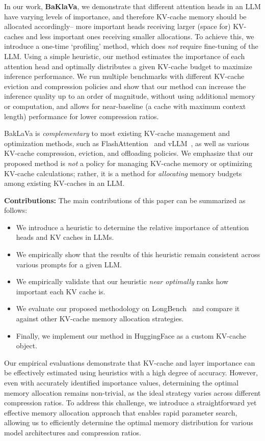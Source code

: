 In our work, {\bf BaKlaVa}, we demonstrate that different attention heads in an LLM have varying levels of importance, and therefore KV-cache memory should be allocated accordingly-- more important heads receiving larger (space for) KV-caches and less important ones receiving smaller allocations. To achieve this, we introduce a one-time `profiling' method, which does \textit{not} require fine-tuning of the LLM. Using a simple heuristic, our method estimates the importance of each attention head and optimally distributes a given KV-cache budget to maximize inference performance. We run multiple benchmarks with different KV-cache eviction and compression policies and show that our method can increase the inference quality up to an order of magnitude, without using additional memory or computation, and allows for near-baseline (a cache with maximum context length) performance for lower compression ratios.

BakLaVa is {\em complementary} to most existing KV-cache management and optimization methods, such as FlashAttention~\cite{flashattention2} and vLLM~\cite{pagedattention}, as well as various KV-cache compression, eviction, and offloading policies. We emphasize that our proposed method is {\em not} a policy for managing KV-cache memory or optimizing KV-cache calculations; rather, it is a method for \emph{allocating} memory budgets among existing KV-caches in an LLM.

\textbf{Contributions:} The main contributions of this paper can be summarized as follows:
\begin{itemize} 
    \item We introduce a heuristic to determine the relative importance of attention heads and KV caches in LLMs.
    \item We empirically show that the results of this heuristic remain consistent across various prompts for a given LLM. 
    \item We empirically validate that our heuristic {\em near optimally} ranks how important each KV cache is.
    \item We evaluate our proposed methodology on LongBench~\cite{bai2023longbench} and compare it against other KV-cache memory allocation strategies.
    \item Finally, we implement our method in HuggingFace as a custom KV-cache object.
\end{itemize}

Our empirical evaluations demonstrate that KV-cache and layer importance can be effectively estimated using heuristics with a high degree of accuracy. However, even with accurately identified importance values, determining the optimal memory allocation remains non-trivial, as the ideal strategy varies across different compression ratios. To address this challenge, we introduce a straightforward yet effective memory allocation approach that enables rapid parameter search, allowing us to efficiently determine the optimal memory distribution for various model architectures and compression ratios.